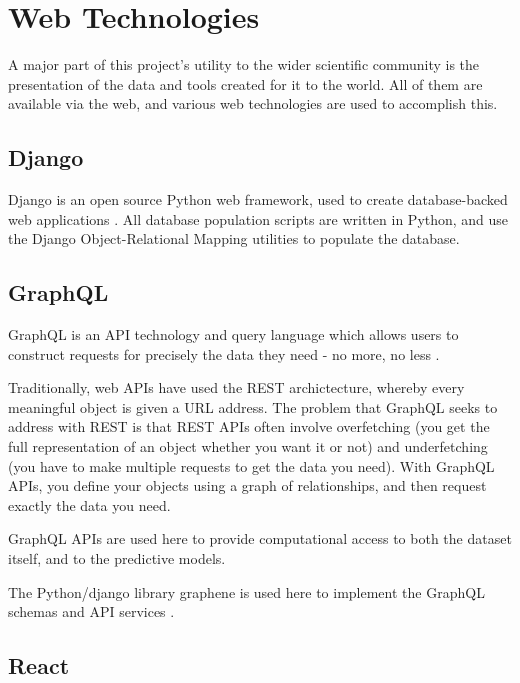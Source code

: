 \section{Web Technologies}

A major part of this project's utility to the wider scientific community is the presentation of the data and tools created for it to the world. All of them are available via the web, and various web technologies are used to accomplish this.


\subsection{Django}

Django is an open source Python web framework, used to create database-backed web applications \cite{django}. All database population scripts are written in Python, and use the Django Object-Relational Mapping utilities to populate the database.

\subsection{GraphQL}

GraphQL is an API technology and query language which allows users to construct requests for precisely the data they need - no more, no less \cite{graphql}.

Traditionally, web APIs have used the REST archictecture, whereby every meaningful object is given a URL address. The problem that GraphQL seeks to address with REST is that REST APIs often involve overfetching (you get the full representation of an object whether you want it or not) and underfetching (you have to make multiple requests to get the data you need). With GraphQL APIs, you define your objects using a graph of relationships, and then request exactly the data you need.

GraphQL APIs are used here to provide computational access to both the dataset itself, and to the predictive models.

The Python/django library graphene is used here to implement the GraphQL schemas and API services \cite{graphene}.

\subsection{React}

